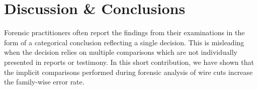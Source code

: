 \documentclass[9pt,twocolumn,twoside]{pnas-new}\usepackage[]{graphicx}\usepackage[dvipsnames]{xcolor}
\begin{document}
\begin{table}
\caption{\label{tab:family-wise}Table showing the relationship between false positive rates and the chance of false identifications in $N$ comparisons for a set of different FPRs and different number of comparisons. The last column gives the number of comparisons allowed while ensuring a false identification percentage of at most 10\%.}
\end{table}

\section*{Discussion \& Conclusions}

Forensic practitioners often report the findings from their examinations in the form of a categorical conclusion reflecting a single decision.
This is misleading when the decision relies on multiple comparisons which are not individually presented in reports or testimony.
In this short contribution, we have shown that the implicit comparisons performed during forensic analysis of wire cuts increase the family-wise error rate.
\end{document}
